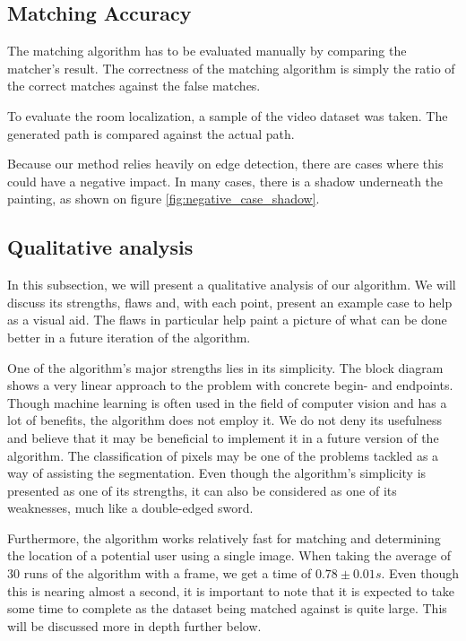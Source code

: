 \subsection{Matching Accuracy}
The matching algorithm has to be evaluated manually by comparing the matcher's result. The correctness of the matching algorithm is simply the ratio of the correct matches against the false matches.

To evaluate the room localization, a sample of the video dataset was taken. The generated path is compared against the actual path.

Because our method relies heavily on edge detection, there are cases where this could have a negative impact. In many cases, there is a shadow underneath the painting, as shown on figure \ref{fig:negative_case_shadow}.



\subsection{Qualitative analysis}
In this subsection, we will present a qualitative analysis of our algorithm. We will discuss its strengths, flaws and, with each point, present an example case to help as a visual aid. The flaws in particular help paint a picture of what can be done better in a future iteration of the algorithm. 


One of the algorithm's major strengths lies in its simplicity. The block diagram shows a very linear approach to the problem with concrete begin- and endpoints. Though machine learning is often used in the field of computer vision and has a lot of benefits, the algorithm does not employ it. We do not deny its usefulness and believe that it may be beneficial to implement it in a future version of the algorithm. The classification of pixels may be one of the problems tackled as a way of assisting the segmentation. Even though the algorithm's simplicity is presented as one of its strengths, it can also be considered as one of its weaknesses, much like a double-edged sword.


Furthermore, the algorithm works relatively fast for matching and determining the location of a potential user using a single image. When taking the average of 30 runs of the algorithm with a frame, we get a time of $0.78\pm0.01 s$. Even though this is nearing almost a second, it is important to note that it is expected to take some time to complete as the dataset being matched against is quite large. This will be discussed more in depth further below.


